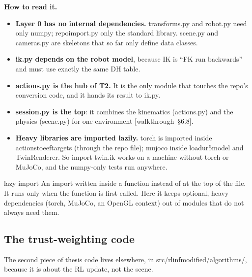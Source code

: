 \documentclass[11pt,a4paper]{article}
\newcommand{\code}[1]{{\small\ttfamily\begingroup\def\_{\textunderscore\allowbreak}\def\/{/\allowbreak}#1\endgroup}}
\newcommand{\wt}[1]{\textcolor{blue!60!black}{\small[walkthrough~§#1]}}
\begin{document}
\textbf{How to read it.}
\begin{itemize}
\item \textbf{Layer 0 has no internal dependencies.} \code{transforms.py} and \code{robot.py} need only numpy; \code{repo\_import.py} only the standard library. \code{scene.py} and \code{cameras.py} are skeletons that so far only define data classes.
\item \textbf{\code{ik.py} depends on the robot model}, because IK is ``FK run backwards'' and must use exactly the same DH table.
\item \textbf{\code{actions.py} is the hub of T2.} It is the only module that touches the repo's conversion code, and it hands its result to \code{ik.py}.
\item \textbf{\code{session.py} is the top}: it combines the kinematics (\code{actions.py}) and the physics (\code{scene.py}) for one environment \wt{6.8}.
\item \textbf{Heavy libraries are imported lazily.} \code{torch} is imported inside \code{actions\_to\_eef\_targets} (through the repo file); \code{mujoco} inside \code{load\_ur5\_model} and \code{TwinRenderer}. So \code{import twin.ik} works on a machine without torch or MuJoCo, and the numpy-only tests run anywhere.
\end{itemize}

\begin{newc}{lazy import}
An \code{import} written inside a function instead of at the top of the file. It runs only when the function is first called. Here it keeps optional, heavy dependencies (torch, MuJoCo, an OpenGL context) out of modules that do not always need them.
\end{newc}

\subsection{The trust-weighting code}
The second piece of thesis code lives elsewhere, in \code{src/rlinf\_modified/algorithms/}, because it is about the RL update, not the scene.
\end{document}
